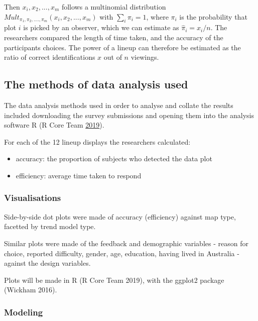 \documentclass[conference,final,]{IEEEtran}
\providecommand{\tightlist}{%
  \setlength{\itemsep}{0pt}\setlength{\parskip}{0pt}}
\begin{document}
Then \(x_i, x_2, ..., x_m\) follows a multinomial
distribution\(Mult_{\pi_1, \pi_2, ...., \pi_m}(x_i, x_2, ..., x_m)\) with
\(\sum_i \pi_i = 1\), where \(\pi_i\) is the probability that plot \(i\) is picked by an
observer, which we can estimate as \(\hat{\pi}_i = x_i/n\).
The researchers compared the length of time taken, and the accuracy of the participants choices.
The power of a lineup can therefore be estimated as the ratio of correct
identifications \(x\) out of \(n\) viewings.

\hypertarget{the-methods-of-data-analysis-used}{%
\subsection{The methods of data analysis used}\label{the-methods-of-data-analysis-used}}

The data analysis methods used in order to analyse and collate the results included downloading the survey submissions and opening them into the analysis software R (R Core Team \protect\hyperlink{ref-RCore}{2019}).

For each of the 12 lineup displays the researchers calculated:

\begin{itemize}
\tightlist
\item
  accuracy: the proportion of subjects who detected the data plot
\item
  efficiency: average time taken to respond
\end{itemize}

\hypertarget{visualisations}{%
\subsubsection{Visualisations}\label{visualisations}}

Side-by-side dot plots were made of accuracy (efficiency) against map type, facetted by trend model type.

Similar plots were made of the feedback and demographic variables - reason for choice, reported difficulty, gender, age, education, having lived in Australia - against the design variables.

Plots will be made in R (R Core Team 2019), with the ggplot2 package (Wickham 2016).

\hypertarget{modeling}{%
\subsubsection{Modeling}\label{modeling}}
\end{document}
